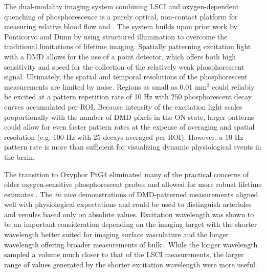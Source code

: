 The dual-modality imaging system combining LSCI and oxygen-dependent quenching of phosphorescence is a purely optical, non-contact platform for measuring relative blood flow and . The system builds upon prior work by Ponticorvo and Dunn \cite{Ponticorvo:2010uv} by using structured illumination to overcome the traditional limitations of lifetime imaging. Spatially patterning excitation light with a DMD allows for the use of a point detector, which offers both high sensitivity and speed for the collection of the relatively weak phosphorescent signal. Ultimately, the spatial and temporal resolutions of the phosphorescent measurements are limited by noise. Regions as small as 0.01 mm$^2$ could reliably be excited at a pattern repetition rate of 10 Hz with 250 phosphorescent decay curves accumulated per ROI. Because intensity of the excitation light scales proportionally with the number of DMD pixels in the ON state, larger patterns could allow for even faster pattern rates at the expense of averaging and spatial resolution (e.g. 100 Hz with 25 decays averaged per ROI). However, a 10 Hz pattern rate is more than sufficient for visualizing dynamic physiological events in the brain.

The transition to Oxyphor PtG4 eliminated many of the practical concerns of older oxygen-sensitive phosphorescent probes and allowed for more robust lifetime estimates \cite{Esipova:2011hi}. The \textit{in vivo} demonstrations of DMD-patterned  measurements aligned well with physiological expectations and could be used to distinguish arterioles and venules based only on absolute  values. Excitation wavelength was shown to be an important consideration depending on the imaging target with the shorter wavelength better suited for imaging surface vasculature and the longer wavelength offering broader measurements of bulk . While the longer wavelength sampled a volume much closer to that of the LSCI measurements, the larger range of  values generated by the shorter excitation wavelength were more useful.



